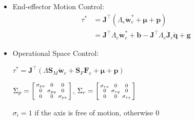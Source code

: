 \documentclass[landscape,a0paper,fontscale=0.285]{baposter} %
\renewenvironment{bmatrix}{\left[\begin{smallmatrix}}{\end{smallmatrix}\right]}
\begin{document}
\begin{poster}
{\begin{itemize}
    \item End-effector Motion Control: 
    $$\begin{aligned}\tau^* &= \mathbf{J}^\top(\Lambda_e\dot{\mathbf{w}}_e^*+\boldsymbol{\mu} + \mathbf{p}) \\&= \mathbf{J}^\top \Lambda_e\dot{\mathbf{w}}_e^*+\mathbf{b}-\mathbf{J}^\top \Lambda_e\dot{\mathbf{J}}_e\dot{\mathbf{q}}+\mathbf{g}\end{aligned}$$
    \item Operational Space Control: 
    
    $\tau^* = \mathbf{J}^\top(\Lambda \mathbf{S}_M\dot{\mathbf{w}}_e + \mathbf{S}_F\mathbf{F}_c + \boldsymbol{\mu} +\mathbf{p})$
      
     $\Sigma_p =\begin{bmatrix}\sigma_{px}&0&0\\0&\sigma_{py}&0\\0&0&\sigma_{pz}\end{bmatrix}$, $\Sigma_r = \begin{bmatrix}\sigma_{rx}&0&0\\0&\sigma_{ry}&0\\0&0&\sigma_{rz}\end{bmatrix}$ 
        
    $\sigma_i=1$ if the axis is free of motion, otherwise $0$
    

\end{itemize}




}




\end{poster}
\newpage
\end{document}
